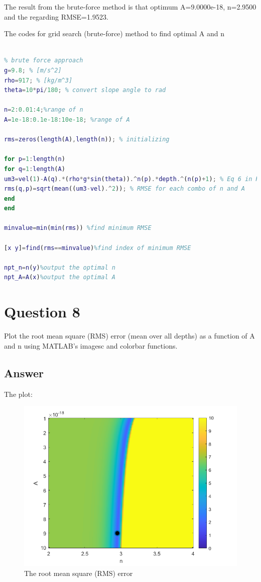 \documentclass[
	12pt, %
]{fphw}
\begin{document}
The result from the brute-force method is that optimum A=9.0000e-18, n=2.9500 and the regarding RMSE=1.9523.


The codes for  grid search (brute-force) method to find optimal A and n
\begin{lstlisting}[language=Matlab,escapeinside=``]

% brute force approach
g=9.8; % [m/s^2]
rho=917; % [kg/m^3]
theta=10*pi/180; % convert slope angle to rad

n=2:0.01:4;%range of n
A=1e-18:0.1e-18:10e-18; %range of A

rms=zeros(length(A),length(n)); % initializing

for p=1:length(n)
for q=1:length(A)
um3=vel(1)-A(q).*(rho*g*sin(theta)).^n(p).*depth.^(n(p)+1); % Eq 6 in HW3
rms(q,p)=sqrt(mean((um3-vel).^2)); % RMSE for each combo of n and A
end
end

minvalue=min(min(rms)) %find minimum RMSE

[x y]=find(rms==minvalue)%find index of minimum RMSE

npt_n=n(y)%output the optimal n
npt_A=A(x)%output the optimal A


\end{lstlisting}

\section*{Question 8 }

\begin{problem}
Plot the root mean square (RMS) error (mean over all depths) as a function of A and n using MATLAB's
imagesc and colorbar functions.
\end{problem}


\subsection*{Answer}

The plot:

\begin{figure}[htbp]
	\centering
	\includegraphics[width=0.8\columnwidth]{Q8.png} 
	\caption{The root mean square (RMS) error }
\end{figure}
\end{document}
